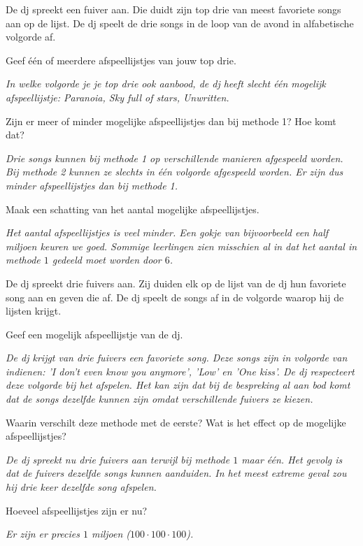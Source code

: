De dj spreekt een fuiver aan. Die duidt zijn top drie van meest favoriete songs aan op de lijst. De dj speelt de drie songs in de loop van de avond in alfabetische volgorde af.

\begin{werktekstoef}

\setcounter{enumi}{3} 

\item{Geef één of meerdere afspeellijstjes van jouw top drie.}

\emph{In welke volgorde je je top drie ook aanbood, de dj heeft slecht één mogelijk afspeellijstje: Paranoia, Sky full of stars, Unwritten.}

\item{Zijn er meer of minder mogelijke afspeellijstjes dan bij methode 1? Hoe komt dat?}

\emph{Drie songs kunnen bij methode 1 op verschillende manieren afgespeeld worden. Bij methode 2 kunnen ze slechts in één volgorde afgespeeld worden. Er zijn dus minder afspeellijstjes dan bij methode 1.}

\item{Maak een schatting van het aantal mogelijke afspeellijstjes.}

\emph{Het aantal afspeellijstjes is veel minder. Een gokje van bijvoorbeeld een half miljoen keuren we goed. Sommige leerlingen zien misschien al in dat het aantal in methode $1$ gedeeld moet worden door $6$.}
\end{werktekstoef}

De dj spreekt drie fuivers aan. Zij duiden elk op de lijst van de dj hun favoriete song aan en geven die af. De dj speelt de songs af in de volgorde waarop hij de lijsten krijgt. 

\begin{werktekstoef}

\setcounter{enumi}{6} 

\item{Geef een mogelijk afspeellijstje van de dj.}

\emph{De dj krijgt van drie fuivers een favoriete song. Deze songs zijn in volgorde van indienen: 'I don't even know you anymore', 'Low' en 'One kiss'. De dj respecteert deze volgorde bij het afspelen. Het kan zijn dat bij de bespreking al aan bod komt dat de songs dezelfde kunnen zijn omdat verschillende fuivers ze kiezen.}

\item{Waarin verschilt deze methode met de eerste? Wat is het effect op de mogelijke afspeellijstjes?}

\emph{De dj spreekt nu drie fuivers aan terwijl bij methode $1$ maar één. Het gevolg is dat de fuivers dezelfde songs kunnen aanduiden. In het meest extreme geval zou hij drie keer dezelfde song afspelen.}

\item{Hoeveel afspeellijstjes zijn er nu?} 

\emph{Er zijn er precies $1$ miljoen ($100\cdot100\cdot100$).}
\end{werktekstoef}

